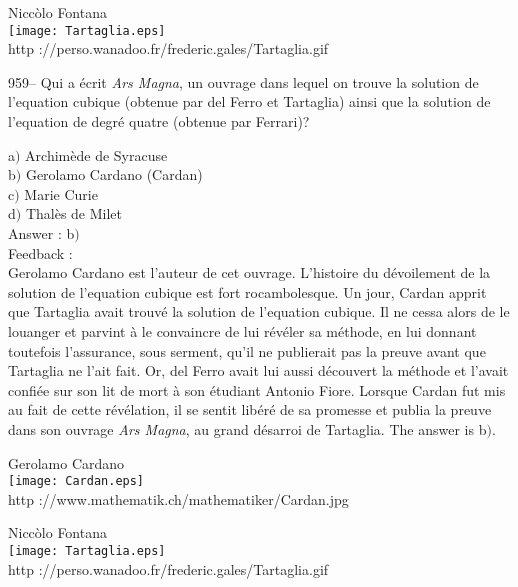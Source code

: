 \documentclass[letterpaper, 12pt]{article}
\begin{document}
        \begin{center}
        Nicc\`olo Fontana\\
    \texttt{[image: Tartaglia.eps]}\\
        {\footnotesize http
://perso.wanadoo.fr/frederic.gales/Tartaglia.gif}
    \end{center}

959-- Qui a \'ecrit {\sl Ars Magna}, un ouvrage dans lequel on
trouve la solution de l'equation cubique (obtenue par del Ferro et
Tartaglia) ainsi que la solution de l'equation de degr\'e quatre
(obtenue par Ferrari)?

a$)$ Archim\`ede de Syracuse  \\
b$)$ Gerolamo Cardano (Cardan)  \\
c$)$ Marie Curie  \\
d$)$ Thal\`es de Milet\\

Answer : b$)$\\

Feedback : \\
Gerolamo Cardano est l'auteur de cet ouvrage. L'histoire du
d\'evoilement de la solution de l'equation cubique est fort
rocambolesque. Un jour, Cardan apprit que Tartaglia avait trouv\'e
la solution de l'equation cubique. Il ne cessa alors de le
louanger et parvint \`a le convaincre de lui r\'ev\'eler sa
m\'ethode, en lui donnant toutefois l'assurance, sous serment, qu'il
ne publierait pas la preuve avant que Tartaglia ne l'ait fait. Or,
del Ferro avait lui aussi d\'ecouvert la m\'ethode et l'avait
confi\'ee sur son lit de mort \`a son \'etudiant Antonio Fiore.
Lorsque Cardan fut mis au fait de cette r\'ev\'elation,
il se sentit lib\'er\'e de sa promesse et publia la preuve dans son ouvrage
{\sl Ars Magna}, au grand d\'esarroi de Tartaglia. The answer is b$)$.\\

        \begin{center}
        Gerolamo Cardano\\
    \texttt{[image: Cardan.eps]}\\
        {\footnotesize http ://www.mathematik.ch/mathematiker/Cardan.jpg}
    \end{center}

        \begin{center}
        Nicc\`olo Fontana\\
    \texttt{[image: Tartaglia.eps]}\\
        {\footnotesize http
://perso.wanadoo.fr/frederic.gales/Tartaglia.gif}
    \end{center}
\end{document}
